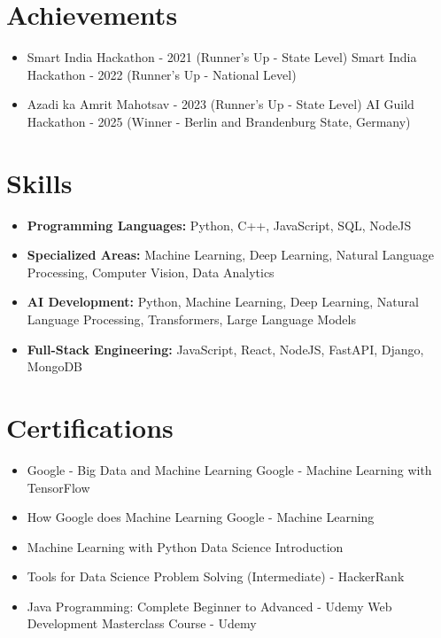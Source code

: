 \documentclass[a4paper,10pt]{article}
\begin{document}
\section*{Achievements}
\begin{itemize}
\item Smart India Hackathon - 2021 (Runner's Up - State Level) \hfill Smart India Hackathon - 2022 (Runner's Up - National Level)
\item Azadi ka Amrit Mahotsav - 2023 (Runner's Up - State Level) \hfill AI Guild Hackathon - 2025 (Winner - Berlin and Brandenburg State, Germany)
\end{itemize}

\section*{Skills}
\begin{itemize}
  \item \textbf{Programming Languages:} Python, C++, JavaScript, SQL, NodeJS
  \item \textbf{Specialized Areas:} Machine Learning, Deep Learning, Natural Language Processing, Computer Vision, Data Analytics
  \item \textbf{AI Development:} Python, Machine Learning, Deep Learning, Natural Language Processing, Transformers, Large Language Models
  \item \textbf{Full-Stack Engineering:} JavaScript, React, NodeJS, FastAPI, Django, MongoDB
\end{itemize}

\section*{Certifications}
\begin{itemize}
\item Google - Big Data and Machine Learning \hfill Google - Machine Learning with TensorFlow
\item How Google does Machine Learning \hfill Google - Machine Learning
\item Machine Learning with Python \hfill Data Science Introduction
\item Tools for Data Science \hfill Problem Solving (Intermediate) - HackerRank
\item Java Programming: Complete Beginner to Advanced - Udemy \hfill Web Development Masterclass Course - Udemy
\end{itemize}
\end{document}
